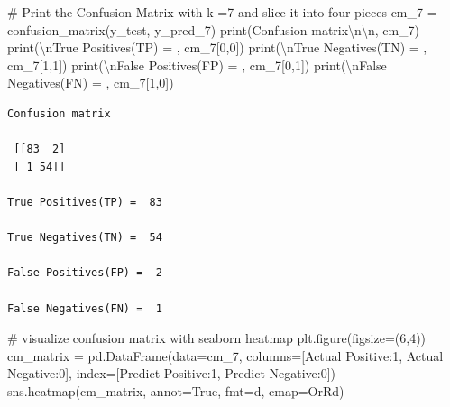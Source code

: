 \documentclass[
  letterpaper,
  DIV=11,
  numbers=noendperiod]{scrreprt}
\newenvironment{Shaded}{\begin{snugshade}}{\end{snugshade}}
\newcommand{\BuiltInTok}[1]{\textcolor[rgb]{0.00,0.23,0.31}{#1}}
\newcommand{\CharTok}[1]{\textcolor[rgb]{0.13,0.47,0.30}{#1}}
\newcommand{\CommentTok}[1]{\textcolor[rgb]{0.37,0.37,0.37}{#1}}
\newcommand{\DecValTok}[1]{\textcolor[rgb]{0.68,0.00,0.00}{#1}}
\newcommand{\NormalTok}[1]{\textcolor[rgb]{0.00,0.23,0.31}{#1}}
\newcommand{\OperatorTok}[1]{\textcolor[rgb]{0.37,0.37,0.37}{#1}}
\newcommand{\StringTok}[1]{\textcolor[rgb]{0.13,0.47,0.30}{#1}}
\newcommand{\VariableTok}[1]{\textcolor[rgb]{0.07,0.07,0.07}{#1}}
\begin{document}
\begin{Shaded}
\begin{Highlighting}[]
\CommentTok{\# Print the Confusion Matrix with k =7 and slice it into four pieces}
\NormalTok{cm\_7 }\OperatorTok{=}\NormalTok{ confusion\_matrix(y\_test, y\_pred\_7)}
\BuiltInTok{print}\NormalTok{(}\StringTok{\textquotesingle{}Confusion matrix}\CharTok{\textbackslash{}n\textbackslash{}n}\StringTok{\textquotesingle{}}\NormalTok{, cm\_7)}
\BuiltInTok{print}\NormalTok{(}\StringTok{\textquotesingle{}}\CharTok{\textbackslash{}n}\StringTok{True Positives(TP) = \textquotesingle{}}\NormalTok{, cm\_7[}\DecValTok{0}\NormalTok{,}\DecValTok{0}\NormalTok{])}
\BuiltInTok{print}\NormalTok{(}\StringTok{\textquotesingle{}}\CharTok{\textbackslash{}n}\StringTok{True Negatives(TN) = \textquotesingle{}}\NormalTok{, cm\_7[}\DecValTok{1}\NormalTok{,}\DecValTok{1}\NormalTok{])}
\BuiltInTok{print}\NormalTok{(}\StringTok{\textquotesingle{}}\CharTok{\textbackslash{}n}\StringTok{False Positives(FP) = \textquotesingle{}}\NormalTok{, cm\_7[}\DecValTok{0}\NormalTok{,}\DecValTok{1}\NormalTok{])}
\BuiltInTok{print}\NormalTok{(}\StringTok{\textquotesingle{}}\CharTok{\textbackslash{}n}\StringTok{False Negatives(FN) = \textquotesingle{}}\NormalTok{, cm\_7[}\DecValTok{1}\NormalTok{,}\DecValTok{0}\NormalTok{])}
\end{Highlighting}
\end{Shaded}

\begin{verbatim}
Confusion matrix

 [[83  2]
 [ 1 54]]

True Positives(TP) =  83

True Negatives(TN) =  54

False Positives(FP) =  2

False Negatives(FN) =  1
\end{verbatim}

\begin{Shaded}
\begin{Highlighting}[]
\CommentTok{\# visualize confusion matrix with seaborn heatmap}
\NormalTok{plt.figure(figsize}\OperatorTok{=}\NormalTok{(}\DecValTok{6}\NormalTok{,}\DecValTok{4}\NormalTok{))}
\NormalTok{cm\_matrix }\OperatorTok{=}\NormalTok{ pd.DataFrame(data}\OperatorTok{=}\NormalTok{cm\_7, columns}\OperatorTok{=}\NormalTok{[}\StringTok{\textquotesingle{}Actual Positive:1\textquotesingle{}}\NormalTok{, }\StringTok{\textquotesingle{}Actual Negative:0\textquotesingle{}}\NormalTok{], }
\NormalTok{                                 index}\OperatorTok{=}\NormalTok{[}\StringTok{\textquotesingle{}Predict Positive:1\textquotesingle{}}\NormalTok{, }\StringTok{\textquotesingle{}Predict Negative:0\textquotesingle{}}\NormalTok{])}
\NormalTok{sns.heatmap(cm\_matrix, annot}\OperatorTok{=}\VariableTok{True}\NormalTok{, fmt}\OperatorTok{=}\StringTok{\textquotesingle{}d\textquotesingle{}}\NormalTok{, cmap}\OperatorTok{=}\StringTok{\textquotesingle{}OrRd\textquotesingle{}}\NormalTok{)}
\end{Highlighting}
\end{Shaded}
\end{document}
